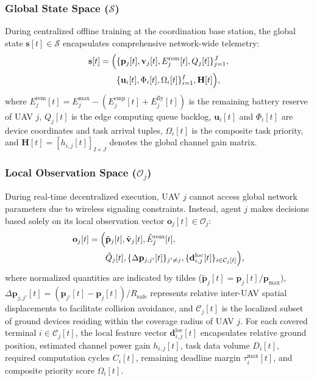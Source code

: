 \documentclass[journal]{IEEEtran}
\begin{document}
\subsubsection{Global State Space (\texorpdfstring{$\mathcal{S}$}{S})}
During centralized offline training at the coordination base station, the global state $\mathbf{s}[t] \in \mathcal{S}$ encapsulates comprehensive network-wide telemetry:
\begin{equation}
\begin{aligned}
    \mathbf{s}[t] = \Bigl( &\{\mathbf{p}_j[t], \mathbf{v}_j[t], E_j^{\mathrm{rem}}[t], Q_j[t]\}_{j=1}^J, \\
    &\{\mathbf{u}_i[t], \Phi_i[t], \Omega_i[t]\}_{i=1}^I, \mathbf{H}[t] \Bigr),
\end{aligned}
\end{equation}
where $E_j^{\mathrm{rem}}[t] = E_j^{\max} - (E_j^{\mathrm{cmp}}[t] + E_j^{\mathrm{fly}}[t])$ is the remaining battery reserve of UAV $j$, $Q_j[t]$ is the edge computing queue backlog, $\mathbf{u}_i[t]$ and $\Phi_i[t]$ are device coordinates and task arrival tuples, $\Omega_i[t]$ is the composite task priority, and $\mathbf{H}[t] = [h_{i,j}[t]]_{I \times J}$ denotes the global channel gain matrix.

\subsubsection{Local Observation Space (\texorpdfstring{$\mathcal{O}_j$}{O\_j})}
During real-time decentralized execution, UAV $j$ cannot access global network parameters due to wireless signaling constraints. Instead, agent $j$ makes decisions based solely on its local observation vector $\mathbf{o}_j[t] \in \mathcal{O}_j$:
\begin{equation}
\begin{aligned}
    \mathbf{o}_j[t] = \Bigl( &\tilde{\mathbf{p}}_j[t], \tilde{\mathbf{v}}_j[t], \tilde{E}_j^{\mathrm{rem}}[t], \\
    &\tilde{Q}_j[t], \{\Delta\mathbf{p}_{j,j'}[t]\}_{j' \neq j},
    \{\mathbf{d}_{i,j}^{\mathrm{loc}}[t]\}_{i \in \mathcal{C}_j[t]} \Bigr),
\end{aligned}
\end{equation}
where normalized quantities are indicated by tildes ($\tilde{\mathbf{p}}_j[t] = \mathbf{p}_j[t]/\mathbf{p}_{\max}$), $\Delta\mathbf{p}_{j,j'}[t] = (\mathbf{p}_{j'}[t] - \mathbf{p}_j[t])/R_{\mathrm{safe}}$ represents relative inter-UAV spatial displacements to facilitate collision avoidance, and $\mathcal{C}_j[t]$ is the localized subset of ground devices residing within the coverage radius of UAV $j$. For each covered terminal $i \in \mathcal{C}_j[t]$, the local feature vector $\mathbf{d}_{i,j}^{\mathrm{loc}}[t]$ encapsulates relative ground position, estimated channel power gain $h_{i,j}[t]$, task data volume $D_i[t]$, required computation cycles $C_i[t]$, remaining deadline margin $\tau_i^{\max}[t]$, and composite priority score $\Omega_i[t]$.
\end{document}
